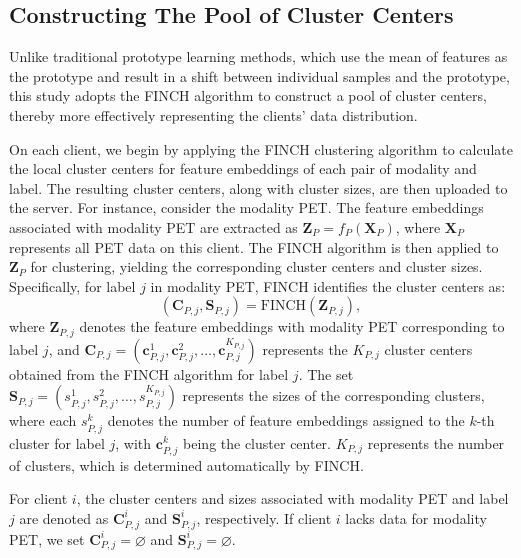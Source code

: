 \subsection{Constructing The Pool of Cluster Centers}
Unlike traditional prototype learning methods, which use the mean of features as the prototype and result in a shift between individual samples and the prototype, this study adopts the FINCH \cite{FINCH} algorithm to construct a pool of cluster centers, thereby more effectively representing the clients' data distribution.

On each client, we begin by applying the FINCH clustering algorithm to calculate the local cluster centers for feature embeddings of each pair of modality and label. The resulting cluster centers, along with cluster sizes, are then uploaded to the server. For instance, consider the modality PET. The feature embeddings associated with modality PET are extracted as \( \mathbf{Z}_P = f_P(\mathbf{X}_P) \), where $\mathbf{X}_P$ represents all PET data on this client. The FINCH algorithm is then applied to \( \mathbf{Z}_P \) for clustering, yielding the corresponding cluster centers and cluster sizes. Specifically, for label \( j \) in modality PET, FINCH identifies the cluster centers as:
\begin{equation}
    (\mathbf{C}_{P,j},\mathbf{S}_{P,j})= \text{FINCH}(\mathbf{Z}_{P,j}),
\end{equation}
where \( \mathbf{Z}_{P,j} \) denotes the feature embeddings with modality PET corresponding to label \( j \), and \( \mathbf{C}_{P,j} = ( \mathbf{c}_{P,j}^{1}, \mathbf{c}_{P,j}^{2}, \dots, \mathbf{c}_{P,j}^{K_{P,j}} )\) represents the \( K_{P,j} \) cluster centers obtained from the FINCH algorithm for label \( j \). The set \( \mathbf{S}_{P,j} =( s_{P,j}^{1}, s_{P,j}^{2}, \dots, s_{P,j}^{K_{P,j}} ) \) represents the sizes of the corresponding clusters, where each \( s_{P,j}^{k} \) denotes the number of feature embeddings assigned to the \( k \)-th cluster for label \( j \), with \( \mathbf{c}_{P,j}^{k} \) being the cluster center. $K_{P,j}$ represents the number of clusters, which is determined automatically by FINCH.

For client \(i\), the cluster centers and sizes associated with modality PET and label \(j\) are denoted as \(\mathbf{C}_{P,j}^i\) and \(\mathbf{S}_{P,j}^i\), respectively. If client \(i\) lacks data for modality PET, we set \(\mathbf{C}_{P,j}^i = \varnothing\) and \(\mathbf{S}_{P,j}^i = \varnothing\).

